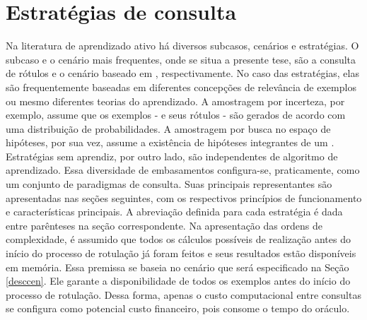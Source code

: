 \section{Estratégias de consulta}\label{secestrategias}
Na literatura de aprendizado ativo há diversos subcasos, cenários e estratégias.
O subcaso e o cenário mais frequentes, onde se situa a presente tese,
são a consulta de rótulos e o cenário baseado em \pool, respectivamente.
No caso das estratégias, elas são frequentemente baseadas em diferentes concepções de relevância de exemplos ou mesmo diferentes teorias do aprendizado.
A amostragem por incerteza, por exemplo, assume que os exemplos - e seus rótulos - são gerados de acordo com uma distribuição de probabilidades.
A amostragem por busca no espaço de hipóteses, por sua vez, assume a
existência de hipóteses integrantes de um \textit{\versionspace}
\cite{books/daglib/0087929}.
Estratégias sem aprendiz, por outro lado, são independentes de algoritmo de aprendizado.
Essa diversidade de embasamentos configura-se, praticamente, como um 
conjunto de paradigmas de consulta.
Suas principais representantes são apresentadas nas seções seguintes, com os respectivos princípios de funcionamento e características principais.
A abreviação definida para cada estratégia é dada entre parênteses
na seção correspondente.
Na apresentação das ordens de complexidade, é assumido que todos os
cálculos possíveis de realização antes do início do processo de rotulação 
já foram feitos e seus resultados estão disponíveis em memória.
Essa premissa se baseia no cenário que será especificado na Seção \ref{desccen}.
Ele garante a disponibilidade de todos os exemplos antes do início do processo de rotulação.
Dessa forma, apenas o custo computacional entre consultas se configura
como potencial custo financeiro, pois consome o tempo do oráculo.

